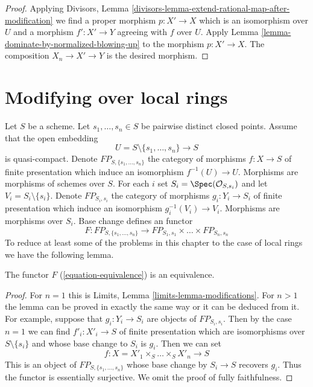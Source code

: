 \begin{proof}
Applying
Divisors, Lemma \ref{divisors-lemma-extend-rational-map-after-modification}
we find a proper morphism $p : X' \to X$ which is an isomorphism
over $U$ and a morphism $f' : X' \to Y$ agreeing with $f$ over $U$.
Apply Lemma \ref{lemma-dominate-by-normalized-blowing-up}
to the morphism $p : X' \to X$. The composition $X_n \to X' \to Y$ is
the desired morphism.
\end{proof}





\section{Modifying over local rings}
\label{section-modifications}

\noindent
Let $S$ be a scheme. Let $s_1, \ldots, s_n \in S$ be pairwise distinct
closed points. Assume that the open embedding
$$
U = S \setminus \{s_1, \ldots, s_n\} \longrightarrow S
$$
is quasi-compact. Denote $FP_{S, \{s_1, \ldots, s_n\}}$
the category of morphisms $f : X \to S$ of finite presentation
which induce an isomorphism $f^{-1}(U) \to U$.
Morphisms are morphisms of schemes over $S$.
For each $i$ set $S_i = \Spec(\mathcal{O}_{S, s_i})$
and let $V_i = S_i \setminus \{s_i\}$. Denote
$FP_{S_i, s_i}$ the category of
morphisms $g_i : Y_i \to S_i$ of finite presentation which induce an
isomorphism $g_i^{-1}(V_i) \to V_i$.
Morphisms are morphisms over $S_i$.
Base change defines an functor
\begin{equation}
\label{equation-equivalence}
F :
FP_{S, \{s_1, \ldots, s_n\}}
\longrightarrow
FP_{S_1, s_1} \times \ldots \times FP_{S_n, s_n}
\end{equation}
To reduce at least some of the problems in this chapter to the case
of local rings we have the following lemma.

\begin{lemma}
\label{lemma-equivalence}
The functor $F$ (\ref{equation-equivalence}) is an equivalence.
\end{lemma}

\begin{proof}
For $n = 1$ this is Limits, Lemma \ref{limits-lemma-modifications}.
For $n > 1$ the lemma can be proved in exactly the same way or it
can be deduced from it. For example, suppose that
$g_i : Y_i \to S_i$ are objects of $FP_{S_i, s_i}$.
Then by the case $n = 1$ we can find $f'_i : X'_i \to S$
of finite presentation
which are isomorphisms over $S \setminus \{s_i\}$ and whose
base change to $S_i$ is $g_i$. Then we can set
$$
f : X = X'_1 \times_S \ldots \times_S X'_n \to S
$$
This is an object of $FP_{S, \{s_1, \ldots, s_n\}}$
whose base change by $S_i \to S$ recovers $g_i$. Thus the functor
is essentially surjective. We omit the proof of
fully faithfulness.
\end{proof}

